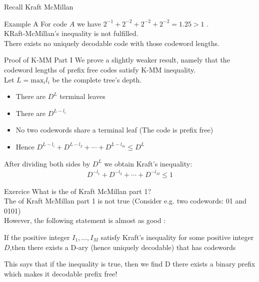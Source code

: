 \begin{parag}{Recall Kraft McMillan}
    \begin{theoreme}
        
    \end{theoreme}
\begin{subparag}{Example A}
    For code $A$ we have $2^{-1} + 2^{-2} + 2^{-2} + 2^{-2} = 1.25 > 1$
    .
    \\
    KRaft-McMillan's inequality is not fulfilled. \\
    There exists no uniquely decodable code with those codeword lengths.
\end{subparag}    
\end{parag}

\begin{parag}{Proof of K-MM Part I}
    We prove a slightly weaker result, namely that the codeword lengths of prefix free codes satisfy K-MM inequality.
    \\
    Let $L = \text{max}_i l_i$ be the complete tree's depth. 
    \begin{itemize}
    \item There are $D^L$ terminal leaves
        \item There are $D^{L-l_i}$
        \item No two codewords share a terminal leaf (The code is prefix free)
        \item Hence $D^{L-l_i} + D^{L-l_2} + \cdots  + D^{L-l_m} \leq D^L$
    \end{itemize}
    After dividing both sides by $D^L$ we obtain Kraft's inequality:
    \begin{align*}
        D^{-l_1} +  D^{-l_2} + \cdots  + D^{-l_M} \leq 1
   \end{align*}
    \begin{subparag}{Exercice}
        What is the  of Kraft McMillan part 1?
        \\
        The  of Kraft McMillan part 1 is not true (Consider e.g. two codewords: 01 and 0101)
        \\
        However, the following statement is almost as good : 
        \begin{theoreme}
            If the positive integer $I_1, \dots, I_M$ satisfy Kraft's inequality for some positive integer $D$,then there exists a D-ary  (hence uniquely decodable) that has codewords
        \end{theoreme}
        
        This says that if the inequality is true, then we  find D  there exists a binary prefix which makes it decodable  prefix free!
    \end{subparag}
\end{parag}

